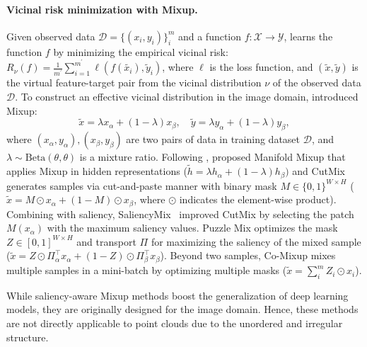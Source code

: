 \documentclass{article}
\begin{document}
\paragraph{Vicinal risk minimization with Mixup.} 
Given observed data $\mathcal{D} = \{(x_i,y_i)\}^m_i$ and a function $f : \mathcal{X} \rightarrow \mathcal{Y}$, \citet{chapelle2000vicinal} learns the function $f$ by minimizing the empirical vicinal risk: $R_\nu(f) = \frac{1}{m^\prime}\sum^{m^\prime}_{i=1}\ell(f(\tilde{x_i}),\tilde{y}_i)$, where $\ell$ is the loss function, and $(\tilde{x},\tilde{y})$ is the virtual feature-target pair from the vicinal distribution $\nu$ of the observed data $\mathcal{D}$. 
To construct an effective vicinal distribution in the image domain, \citet{DBLP:conf/iclr/ZhangCDL18} introduced Mixup:
\begin{equation}
\tilde{x} = \lambda x_\alpha + (1- \lambda) x_\beta,\quad
\tilde{y} = \lambda y_\alpha + (1- \lambda) y_\beta,
\label{eq:mixup}
\end{equation}
where $(x_\alpha, y_\alpha), (x_\beta, y_\beta)$ are two pairs of data in training dataset $\mathcal{D}$, and $\lambda \sim \text{Beta}(\theta,\theta)$ is a mixture ratio. Following \cite{DBLP:conf/iclr/ZhangCDL18},
\citet{verma2019manifold} proposed Manifold Mixup that applies Mixup in hidden representations (\ie $\tilde{h} = \lambda h_\alpha + (1- \lambda) h_\beta)$ and CutMix~\cite{yun2019cutmix} generates samples via cut-and-paste manner with binary mask $M\in \{0,1\}^{W \times H}$ (\ie $\tilde{x} = M\odot x_\alpha + (1-M)\odot x_\beta$, where $\odot$ indicates the element-wise product). 
Combining with saliency,  SaliencyMix~\cite{DBLP:conf/iclr/UddinMSCB21} improved CutMix by selecting the patch $M(x_\alpha)$ with the maximum saliency values.
Puzzle Mix optimizes the mask $Z\in[0,1]^{W\times H}$ and transport $\Pi$ for maximizing the saliency of the mixed sample (\ie $\tilde{x}=Z \odot \Pi^\top_\alpha x_\alpha + (1-Z) \odot \Pi^\top_\beta x_\beta$). 
Beyond two samples, Co-Mixup mixes multiple samples in a mini-batch by optimizing multiple masks (\ie $\tilde{x}=\sum^m_i Z_i\odot x_i$).

While saliency-aware Mixup methods boost the generalization of deep learning models, they are originally designed for the image domain. Hence, these methods are not directly applicable to point clouds due to the unordered and irregular structure.
\end{document}
